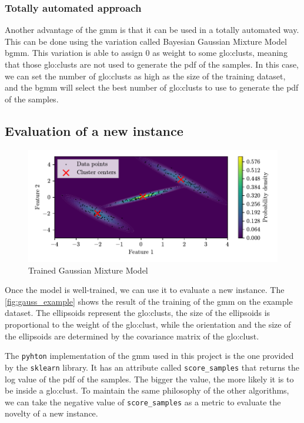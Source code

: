 \subsubsection{Totally automated approach}
\label{sec:gauss_unsupervised}
Another advantage of the \gls{gmm} is that it can be used in a totally automated way. This can be done using the variation called Bayesian Gaussian Mixture Model \gls{bgmm}. This variation is able to assign $0$ as 
weight to some \gls{glo:clust}s, meaning that those \gls{glo:clust}s are not used to generate the \gls{pdf} of the samples. In this case, we can set the number of \gls{glo:clust}s as high as the size of the training dataset, and the \gls{bgmm} will select the best number of \gls{glo:clust}s to use to generate the \gls{pdf} of the samples. 

\subsection{Evaluation of a new instance}
\label{sec:gauss_eval}
\begin{figure}
    \centering
    \includegraphics{images/Gaussian/Figure_2.pdf}
    \caption{Trained Gaussian Mixture Model}
    \label{fig:gauss_example}
\end{figure}
Once the model is well-trained, we can use it to evaluate a new instance. The \autoref{fig:gauss_example} shows the result of the training of the \gls{gmm} on the example dataset. The ellipsoids represent the \gls{glo:clust}s, the size of the ellipsoids is proportional to the weight of the \gls{glo:clust}, while the orientation and the size of the ellipsoids are determined by the covariance matrix of the \gls{glo:clust}. 

The \texttt{pyhton} implementation of the \gls{gmm} used in this project is the one provided by the \texttt{sklearn} library. It has an attribute called \texttt{score\_samples} that returns the log value of the \gls{pdf} of the samples.
The bigger the value, the more likely it is to be inside a \gls{glo:clust}. 
To maintain the same philosophy of the other algorithms, we can take the negative value of \texttt{score\_samples} as a metric to evaluate the novelty of a new instance. 

